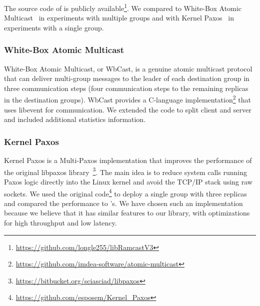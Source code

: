The source code of \libname is publicly
available\footnote{\url{https://github.com/longle255/libRamcastV3}}. We compared
\libname to White-Box Atomic Multicast~\cite{gotsman2019white} in experiments
with multiple groups and with Kernel Paxos~\cite{esposito2018kernel} in
experiments with a single group.

\subsubsection*{White-Box Atomic Multicast}
White-Box Atomic Multicast, or WbCast, is a genuine atomic multicast protocol that can deliver multi-group messages to the leader of each destination group in three communication steps (four communication steps to the remaining replicas in the destination groups).
 WbCast provides a C-language implementation\footnote{\url{https://github.com/imdea-software/atomic-multicast}} that uses libevent for communication.
 We extended the code to split client and server and included additional statistics information.

\subsubsection*{Kernel Paxos}
Kernel Paxos is a Multi-Paxos implementation that improves the performance of the original libpaxos library~\footnote{\url{https://bitbucket.org/sciasciad/libpaxos}}.
The main idea is to reduce system calls running Paxos logic directly into the Linux kernel and avoid the TCP/IP stack using raw sockets. 
We used the original code\footnote{\url{https://github.com/esposem/Kernel_Paxos}} to deploy a single group with three replicas and compared the performance to \libname's.
We have chosen such an implementation because we believe that it has similar features to our library, with optimizations for high throughput and low latency.
